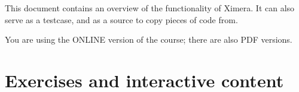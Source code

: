 \documentclass{ximera}
\begin{document}
    \author{Wim Obbels}
    \label{xim:ximeraShowase}

This document contains an overview of the functionality of Ximera. It can also serve as a testcase, and as a source to copy pieces of code from.


\begin{onlineOnly}
    You are using the ONLINE version of the course; there are also PDF versions. %
\end{onlineOnly}


\section{Exercises and interactive content}\label{sec:showCase:voorbeelden_problemen}
\end{document}
